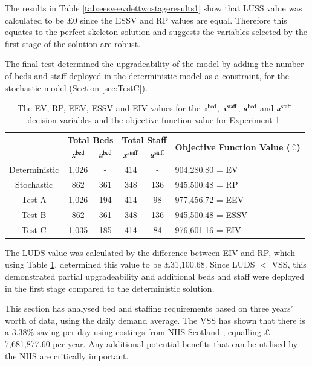 \documentclass[../thesis.tex]{subfiles}
\begin{document}
The results in Table \ref{tab:eesveevdettwostageresults1} show that LUSS value was calculated to be $\pounds$0 since the ESSV and RP values are equal. Therefore this equates to the perfect skeleton solution and suggests the variables selected by the first stage of the solution are robust.

The final test determined the upgradeability of the model by adding the number of beds and staff deployed in the deterministic model as a constraint, for the stochastic model (Section \ref{sec:TestC}). 

\begin{table}[h!]
    \centering
    \begin{tabular}{cccccl}\toprule
 & \multicolumn{2}{l}{\textbf{Total Beds}} & \multicolumn{2}{c}{\textbf{Total Staff}} & \multirow{2}{*}{\textbf{Objective Function Value ($\pounds$)}}\\ \cmidrule(lr){2-3} \cmidrule(lr){4-5}
 & $x^\textnormal{bed}$           & $u^\textnormal{bed}$          & $x^\textnormal{staff}$         & $u^\textnormal{staff}$         \\ \midrule
       Deterministic & 1,026 & - &  414 & - & 904,280.80 =  EV \\ \midrule
      Stochastic & 862 & 361  & 348 & 136 & 945,500.48 = RP\\ \midrule
      Test A & 1,026 & 194 & 414&  98 &  977,456.72 = EEV \\\midrule
      Test B & 862 & 361  & 348 & 136 & 945,500.48 = ESSV\\\midrule
      Test C & 1,035 & 185 &  414  & 84 &  976,601.16 = EIV \\\bottomrule
    \end{tabular}
    \caption{The EV, RP, EEV, ESSV and EIV values for the $x^\textnormal{bed}$, $x^\textnormal{staff}$, $u^\textnormal{bed}$ and $u^\textnormal{staff}$ decision variables and the objective function value for Experiment 1.}
    \label{tab:eiveesveevdettwostageresults1}
\end{table}

The LUDS value was calculated by the difference between EIV and RP, which using Table \ref{tab:eiveesveevdettwostageresults1}, determined this value to be $\pounds$31,100.68. Since LUDS $<$ VSS, this demonstrated partial upgradeability and additional beds and staff were deployed in the first stage compared to the deterministic solution.

This section has analysed bed and staffing requirements based on three years' worth of data, using the daily demand average. The VSS has shown that there is a 3.38\% saving per day using costings from NHS Scotland \cite{PHS2021}, equalling $\pounds$7,681,877.60 per year. Any additional potential benefits that can be utilised by the NHS are critically important. 
\end{document}
